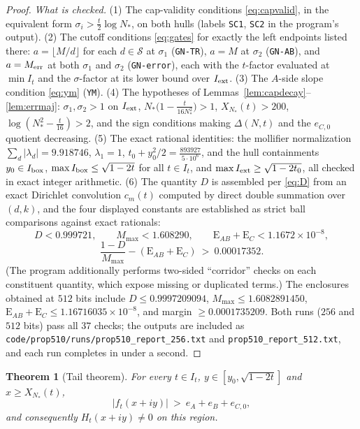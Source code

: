 \documentclass[11pt]{article}
\newtheorem{theorem}{Theorem}[section]
\theoremstyle{definition}
\newcommand{\calS}{\mathcal{S}}
\begin{document}
\begin{proof}
\emph{What is checked.} (1) The cap-validity conditions
\eqref{eq:capvalid}, in the equivalent form
$\sigma_i>\frac t2\log N_*$, on both hulls (labels \texttt{SC1},
\texttt{SC2} in the program's output). (2) The cutoff conditions
\eqref{eq:gates} for exactly the left endpoints listed there:
$a=\lfloor M/d\rfloor$ for each $d\in\calS$ at $\sigma_1$
(\texttt{GN-TR}), $a=M$ at $\sigma_2$ (\texttt{GN-AB}), and
$a=M_{\rm err}$ at both $\sigma_1$ and $\sigma_2$
(\texttt{GN-error}), each with the $t$-factor evaluated at
$\min I_t$ and the $\sigma$-factor at its lower bound over
$I_{\rm ext}$. (3) The $A$-side slope condition \eqref{eq:ym}
(\texttt{YM}). (4) The hypotheses of
Lemmas~\ref{lem:capdecay}--\ref{lem:errmaj}: $\sigma_1,\sigma_2>1$
on $I_{\rm ext}$, $N_*\bigl(1-\frac t{16N_*^2}\bigr)>1$,
$X_{N_*}(t)>200$, $\log(N_*^2-\frac t{16})>2$, and the sign
conditions making $\Delta(N,t)$ and the $e_{C,0}$ quotient
decreasing. (5) The exact rational identities: the mollifier
normalization $\sum_d|\lambda_d|=9.918746$, $\lambda_1=1$,
$t_0+y_0^2/2=\frac{893927}{5\cdot10^6}$, and the hull containments
$y_0\in I_{\rm box}$,
$\max I_{\rm box}\le\sqrt{1-2t}$ for all $t\in I_t$, and
$\max I_{\rm ext}\ge\sqrt{1-2t_0}$, all checked in exact integer
arithmetic. (6) The quantity $D$ is assembled per \eqref{eq:D}
from an exact Dirichlet convolution $c_m(t)$ computed by direct
double summation over $(d,k)$, and the four displayed constants
are established as strict ball comparisons against exact rationals:
\[
D<0.999721,\qquad M_{\max}<1.608290,\qquad
\mathrm{E}_{AB}+\mathrm{E}_{C}<1.1672\times10^{-8},
\]
\[
\frac{1-D}{M_{\max}}-(\mathrm{E}_{AB}+\mathrm{E}_{C})
\ >\ 0.00017352 .
\]
(The program additionally performs two-sided ``corridor'' checks on
each constituent quantity, which expose missing or duplicated
terms.) The enclosures obtained
at $512$ bits include
$D\le0.9997209094$, $M_{\max}\le1.6082891450$,
$\mathrm{E}_{AB}+\mathrm{E}_{C}\le1.16716035\times10^{-8}$, and
margin $\ge0.0001735209$. Both runs ($256$ and $512$ bits) pass all
$37$ checks; the outputs are included as
\texttt{code/prop510/runs/prop510\_report\_256.txt}
and \texttt{prop510\_report\_512.txt}, and each run completes in
under a second.
\end{proof}

\begin{theorem}[Tail theorem]\label{thm:tail}
For every $t\in I_t$, $y\in[y_0,\sqrt{1-2t}]$ and
$x\ge X_{N_*}(t)$,
\[
|f_t(x+iy)|\ >\ e_A+e_B+e_{C,0},
\]
and consequently $H_t(x+iy)\ne0$ on this region.
\end{theorem}
\end{document}
